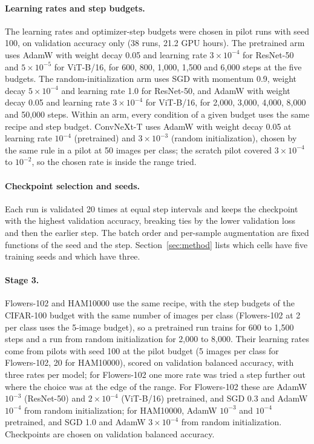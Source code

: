 \paragraph{Learning rates and step budgets.}
The learning rates and optimizer-step budgets were chosen in pilot runs with seed 100, on validation accuracy only (38 runs, 21.2 GPU hours). The pretrained arm uses AdamW with weight decay 0.05 and learning rate $3\times10^{-4}$ for ResNet-50 and $5\times10^{-5}$ for ViT-B/16, for 600, 800, 1,000, 1,500 and 6,000 steps at the five budgets. The random-initialization arm uses SGD with momentum 0.9, weight decay $5\times10^{-4}$ and learning rate 1.0 for ResNet-50, and AdamW with weight decay 0.05 and learning rate $3\times10^{-4}$ for ViT-B/16, for 2,000, 3,000, 4,000, 8,000 and 50,000 steps. Within an arm, every condition of a given budget uses the same recipe and step budget.
ConvNeXt-T uses AdamW with weight decay 0.05 at learning rate $10^{-4}$ (pretrained) and $3\times10^{-3}$ (random
initialization), chosen by the same rule in a pilot at 50 images per class; the scratch pilot covered $3\times10^{-4}$
to $10^{-2}$, so the chosen rate is inside the range tried.

\paragraph{Checkpoint selection and seeds.}
Each run is validated 20 times at equal step intervals and keeps the checkpoint with the highest validation accuracy, breaking ties by the lower validation loss and then the earlier step. The batch order and per-sample augmentation are fixed functions of the seed and the step.
Section~\ref{sec:method} lists which cells have five training seeds and which have three.

\paragraph{Stage 3.}
Flowers-102 and HAM10000 use the same recipe, with the step budgets of the CIFAR-100 budget with the same number
of images per class (Flowers-102 at 2 per class uses the 5-image budget), so a pretrained run trains for 600 to
1{,}500 steps and a run from random initialization for 2{,}000 to 8{,}000. Their learning rates come from pilots
with seed 100 at the pilot budget (5 images per class for Flowers-102, 20 for HAM10000), scored on validation
balanced accuracy, with three rates per model; for Flowers-102 one more rate was tried a step further out where
the choice was at the edge of the range. For
Flowers-102 these are AdamW $10^{-3}$ (ResNet-50) and $2\times10^{-4}$ (ViT-B/16) pretrained, and SGD 0.3 and AdamW
$10^{-4}$ from random initialization; for HAM10000, AdamW $10^{-3}$ and $10^{-4}$ pretrained, and SGD 1.0 and AdamW
$3\times10^{-4}$ from random initialization. Checkpoints are chosen on validation balanced accuracy.
